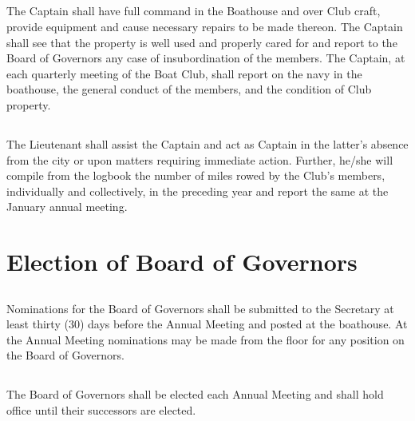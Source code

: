 \documentclass[11pt,american,letterpaper,]{constitution}
\begin{document}
\subsection[Captain]{} 

The Captain shall have full command in the Boathouse and over Club craft, provide equipment and cause necessary repairs to be made thereon. The Captain shall see that the property is well used and properly cared for and report to the Board of Governors any case of insubordination of the members. The Captain, at each quarterly meeting of the Boat Club, shall report on the navy in the boathouse, the general conduct of the members, and the condition of Club property.

\subsection[Lieutenant]{} 

The Lieutenant shall assist the Captain and act as Captain in the latter's absence from the city or upon matters requiring immediate action. Further, he/she will compile from the logbook the number of miles rowed by the Club's members, individually and collectively, in the preceding year and report the same at the January annual meeting.

\section{Election of Board of Governors}

\subsection[Nominations]{} 

Nominations for the Board of Governors shall be submitted to the Secretary at least thirty (30) days before the Annual Meeting and posted at the boathouse. At the Annual Meeting nominations may be made from the floor for any position on the Board of Governors.

\subsection[Time of Elections]{} 

The Board of Governors shall be elected each Annual Meeting and shall hold office until their successors are elected.

\subsection[Vacancies]{} 
\end{document}
